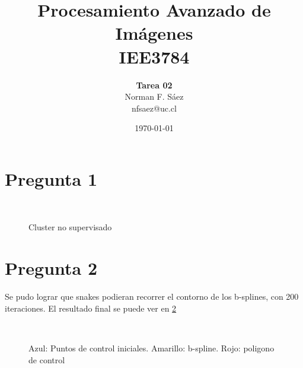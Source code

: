 \documentclass[a4paper,10pt]{article}
\title{Procesamiento Avanzado de Imágenes\\IEE3784}
\author{\textbf{Tarea 02}\\Norman F. Sáez\\nfsaez@uc.cl}
\date{\today}
\begin{document}
\maketitle
\section{Pregunta 1}
\begin{figure}[ht!]
  \centering
  ~ 
  \caption{Cluster no supervisado}
  \label{fig:p1}
\end{figure}

\section{Pregunta 2}
Se pudo lograr que snakes podieran recorrer el contorno de los b-splines, con 200 iteraciones. El resultado final se puede ver en \ref{fig:p2}
\begin{figure}[ht!]
  \centering
  ~ 
  \caption{Azul: Puntos de control iniciales. Amarillo: b-spline.  Rojo: poligono de control}
  \label{fig:p2}
\end{figure}
\end{document}
